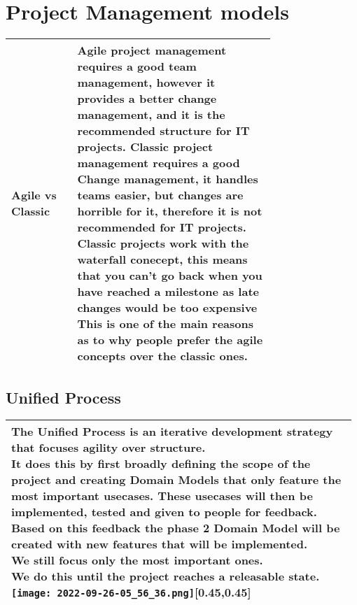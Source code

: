 \documentclass[main.tex,fontsize=8pt,paper=a4,paper=portrait,DIV=calc,]{scrartcl}
\begin{document}
\section{Project Management models}
\begin{table}[h!]
\begin{tabular}{|m{0,205\linewidth}|m{0.75\linewidth}|}
\hline
Agile vs Classic & 
Agile project management requires \textbf{a good team management}, however it provides a better change management, and it is the recommended structure for IT projects.\newline
Classic project management requires \textbf{a good Change management}, it handles teams easier, but changes are horrible for it, therefore it is not recommended for IT projects.\newline
Classic projects work with the \textbf{waterfall conecept}, this means that you can't go back when you have reached a milestone as \textbf{late changes would be too expensive}\newline
This is one of the main reasons as to why people prefer the agile concepts over the classic ones.\\
\hline
\end{tabular}
\subsection{Unified Process}
\begin{tabular}{|m{0.975\linewidth}|}
\hline
\minipg{
The Unified Process is an iterative development strategy that focuses agility over structure.\newline
It does this by first broadly defining the scope of the project and creating Domain Models that only feature the most important usecases.
These usecases will then be implemented, tested and given to people for feedback.\newline
Based on this feedback the phase 2 Domain Model will be created with new features that will be implemented.\newline We still focus only the most important ones.\newline
We do this until the project reaches a releasable state. \\}
{\texttt{[image: 2022-09-26-05\_56\_36.png]}}[0.45,0.45]\\
\hline
\end{tabular}

\end{table}
\end{document}
